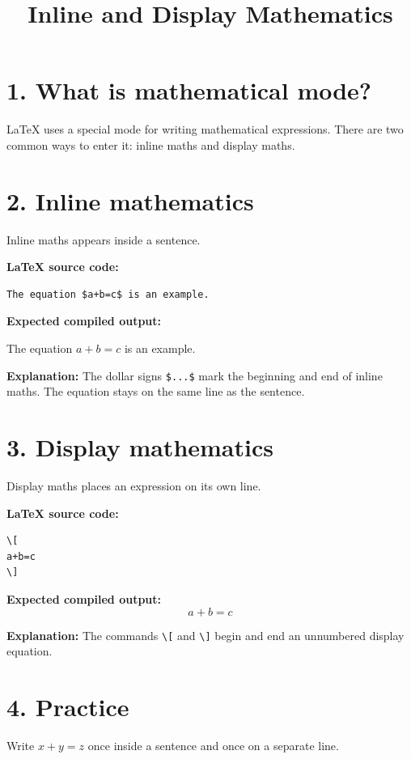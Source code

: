 \documentclass{article}
\title{Inline and Display Mathematics}
\author{ }
\date{}
\begin{document}
\maketitle

\section*{1. What is mathematical mode?}
LaTeX uses a special mode for writing mathematical expressions. There are two common ways to enter it: inline maths and display maths.

\section*{2. Inline mathematics}
Inline maths appears inside a sentence.

\textbf{LaTeX source code:}
\begin{verbatim}
The equation $a+b=c$ is an example.
\end{verbatim}

\textbf{Expected compiled output:}

The equation \(a+b=c\) is an example.

\textbf{Explanation:}
The dollar signs \verb|$...$| mark the beginning and end of inline maths. The equation stays on the same line as the sentence.

\section*{3. Display mathematics}
Display maths places an expression on its own line.

\textbf{LaTeX source code:}
\begin{verbatim}
\[
a+b=c
\]
\end{verbatim}

\textbf{Expected compiled output:}
\[
a+b=c
\]

\textbf{Explanation:}
The commands \verb|\[| and \verb|\]| begin and end an unnumbered display equation.

\section*{4. Practice}
Write \(x+y=z\) once inside a sentence and once on a separate line.
\end{document}
